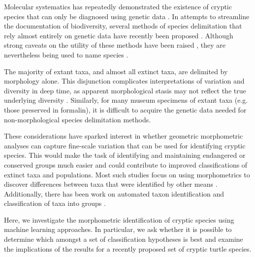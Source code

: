 \documentclass[12pt,letterpaper]{article}
\begin{document}
Molecular systematics has repeatedly demonstrated the existence of cryptic species that can only be diagnosed using genetic data \citep{Stuart2006,Bickford2007,SchlickSteiner2007,Pfenninger2007,Clare2011,Funk2012}. In attempts to streamline the documentation of biodiversity, several methods of species delimitation that rely almost entirely on genetic data have recently been proposed \citep{Pons2006,Carstens2010,Hausdorf2010,O'Meara2010,Yang2010b,Huelsenbeck2011b}. Although strong caveats on the utility of these methods have been raised \citep{Bauer2000,Carstens2013}, they are nevertheless being used to name species \citep{Leache2010,Spinks2014}.

The majority of extant taxa, and almost all extinct taxa, are delimited by morphology alone. This disjunction complicates interpretations of variation and diversity in deep time, as apparent morphological stasis may not reflect the true underlying diversity \citep{Eldredge1972,Gould1977a,Hunt2008,VanBocxlaer2013}. Similarly, for many museum specimens of extant taxa (e.g. those preserved in formalin), it is difficult to acquire the genetic data needed for non-morphological species delimitation methods.

These considerations have sparked interest in whether geometric morphometric analyses can capture fine-scale variation that can be used for identifying cryptic species. This would make the task of identifying and maintaining endangered or conserved groups much easier and could contribute to improved classifications of extinct taxa and populations. Most such studies focus on using morphometrics to discover differences between taxa that were identified by other means \citep{Polly2003,Zelditch2004,Gaubert2005b,Gunduz2007,Polly2007a,Demandt2009}. Additionally, there has been work on automated taxon identification and classification of taxa into groups \citep{Baylac2003,Dobigny2003,MacLeod2007,VandenBrink2011}. 

Here, we investigate the morphometric identification of cryptic species using machine learning approaches. In particular, we ask whether it is possible to determine which amongst a set of classification hypotheses is best and examine the implications of the results for a recently proposed set of cryptic turtle species.

\end{document}
